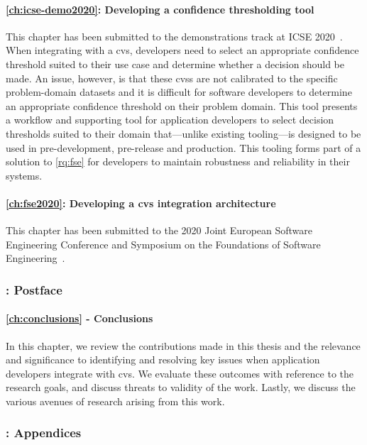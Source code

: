 \paragraph{\cref{ch:icse-demo2020}: Developing a confidence thresholding tool} This chapter has been submitted to the demonstrations track at ICSE 2020~\citep{Cummaudo:2020icse-demo}. When integrating with a \gls{cvs}, developers need to select an appropriate confidence threshold suited to their use case and determine whether a decision should be made. An issue, however, is that these \glspl{cvs} are not calibrated to the specific problem-domain datasets and it is difficult for software developers to determine an appropriate confidence threshold on their problem domain. This tool presents a workflow and supporting tool for application developers to select decision thresholds suited to their domain that---unlike existing tooling---is designed to be used in pre-development, pre-release and production. This tooling forms part of a solution to \ref{rq:fse} for developers to maintain robustness and reliability in their systems.

\paragraph{\cref{ch:fse2020}: Developing a \gls{cvs} integration architecture} This chapter has been submitted to the 2020 Joint European Software Engineering Conference and Symposium on the Foundations of Software Engineering~\citep{Cummaudo:2020esecfse}.

\subsubsection{: Postface}

\paragraph{\cref{ch:conclusions} - Conclusions} In this chapter, we review the contributions made in this thesis and the relevance and significance to identifying and resolving key issues when application developers integrate with \gls{cvs}. We evaluate these outcomes with reference to the research goals, and discuss threats to validity of the work. Lastly, we discuss the various avenues of research arising from this work.

\subsubsection{: Appendices}

